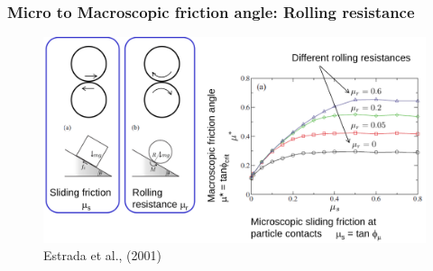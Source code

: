 \documentclass[notes]{beamer}
\begin{document}
\begin{frame}
	\frametitle{Micro to Macroscopic friction angle: Rolling resistance}
	\begin{figure}
		\includegraphics[width=\textwidth]{figs/rolling-resistance.png}
		\caption*{Estrada et al., (2001)}
	\end{figure}
\end{frame}
\end{document}
